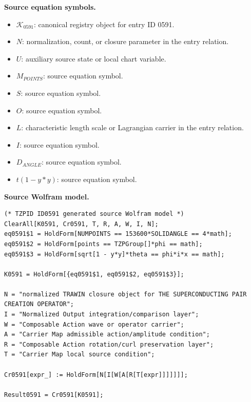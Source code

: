 \begin{minipage}[t]{0.49\linewidth}
\begingroup
\small
\raggedright
\textbf{Source equation symbols.}\par
\begin{itemize}[leftmargin=1.35em,itemsep=1pt,topsep=1pt,parsep=0pt]
    \item $\mathcal{K}_{0591}$: canonical registry object for entry ID 0591.
    \item $N$: normalization, count, or closure parameter in the entry relation.
    \item $U$: auxiliary source state or local chart variable.
    \item $M_{POINTS}$: source equation symbol.
    \item $S$: source equation symbol.
    \item $O$: source equation symbol.
    \item $L$: characteristic length scale or Lagrangian carrier in the entry relation.
    \item $I$: source equation symbol.
    \item $D_{ANGLE}$: source equation symbol.
    \item $t(1-y*y)$: source equation symbol.
\end{itemize}
\endgroup
\end{minipage}\hfill
\begin{minipage}[t]{0.47\linewidth}
\begingroup
\scriptsize
\raggedright
\textbf{Source Wolfram model.}\par
\begin{Verbatim}[fontsize=\tiny,breaklines=true,breakanywhere=true]
(* TZPID ID0591 generated source Wolfram model *)
ClearAll[K0591, Cr0591, T, R, A, W, I, N];
eq0591$1 = HoldForm[NUMPOINTS == 153600*SOLIDANGLE == 4*math];
eq0591$2 = HoldForm[points == TZPGroup[]*phi == math];
eq0591$3 = HoldForm[sqrt[1 - y*y]*theta == phi*i*x == math];

K0591 = HoldForm[{eq0591$1, eq0591$2, eq0591$3}];

N = "normalized TRAWIN closure object for THE SUPERCONDUCTING PAIR CREATION OPERATOR";
I = "Normalized Output integration/comparison layer";
W = "Composable Action wave or operator carrier";
A = "Carrier Map admissible action/amplitude condition";
R = "Composable Action rotation/curl preservation layer";
T = "Carrier Map local source condition";

Cr0591[expr_] := HoldForm[N[I[W[A[R[T[expr]]]]]]];

Result0591 = Cr0591[K0591];
\end{Verbatim}
\endgroup
\end{minipage}

